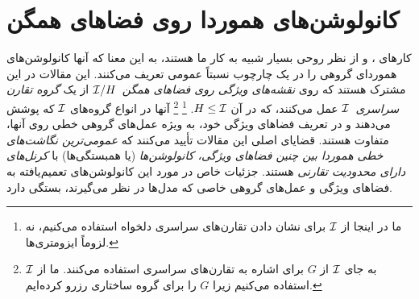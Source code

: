 

\section{کانولوشن‌های هموردا روی فضاهای همگن}
\label{apx:homogeneous_conv}

کارهای \citet{Kondor2018-GENERAL}، \citet{Cohen2018-intertwiners}\cite{Cohen2019-generaltheory} و \citet{bekkers2020bspline} از نظر روحی بسیار شبیه به کار ما هستند، به این معنا که آنها کانولوشن‌های هموردای گروهی را در یک چارچوب نسبتاً عمومی تعریف می‌کنند.
این مقالات در این مشترک هستند که روی \emph{نقشه‌های ویژگی روی فضاهای همگن}~$\mathcal{I}/H$ از یک \emph{گروه تقارن سراسری}~$\mathcal{I}$ عمل می‌کنند، که در آن $H\leq\mathcal{I}$.%
\footnote{
	ما در اینجا از $\mathcal{I}$ برای نشان دادن تقارن‌های سراسری دلخواه استفاده می‌کنیم، نه لزوماً ایزومتری‌ها.
}%
\footnote{
	\cite{Kondor2018-GENERAL,Cohen2019-generaltheory,bekkers2020bspline} به جای $\mathcal{I}$ از $G$ برای اشاره به تقارن‌های سراسری استفاده می‌کنند.
	ما از $\mathcal{I}$ استفاده می‌کنیم زیرا $G$ را برای گروه ساختاری رزرو کرده‌ایم.
}
آنها در انواع گروه‌های $\mathcal{I}$ که پوشش می‌دهند و در تعریف فضاهای ویژگی خود، به ویژه عمل‌های گروهی خطی روی آنها، متفاوت هستند.
قضایای اصلی این مقالات تأیید می‌کنند که \emph{عمومی‌ترین نگاشت‌های خطی هموردا بین چنین فضاهای ویژگی، کانولوشن‌ها} (یا همبستگی‌ها) با \emph{کرنل‌های دارای محدودیت تقارنی} هستند.
جزئیات خاص در مورد این کانولوشن‌های تعمیم‌یافته به فضاهای ویژگی و عمل‌های گروهی خاصی که مدل‌ها در نظر می‌گیرند، بستگی دارد.

